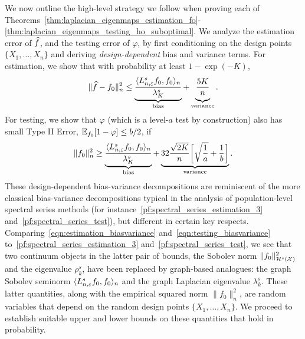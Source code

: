 We now outline the high-level strategy we follow when proving each of Theorems~\ref{thm:laplacian_eigenmaps_estimation_fo}-\ref{thm:laplacian_eigenmaps_testing_ho_suboptimal}. We analyze the estimation error of $\widehat{f}$, and the testing error of $\varphi$, by first conditioning on the design points $\{X_1,\ldots,X_n\}$ and deriving \emph{design-dependent} bias and variance terms. For estimation, we show that with probability at least $1 - \exp(-K)$,
\begin{equation}
\label{eqn:estimation_biasvariance}
\|\wh{f} - f_0\|_n^2 \leq \underbrace{\frac{\dotp{L_{n,\varepsilon}^s f_0}{f_0}_n}{\lambda_{K}^s}}_{\textrm{bias}} + \underbrace{\frac{5K}{n} \vphantom{\frac{\dotp{L^s f_0}{f_0}_n}{\lambda_{K}^s}}}_{\textrm{variance}}.
\end{equation}
For testing, we show that $\varphi$ (which is a level-$a$ test by construction) also has small Type II Error, $\mathbb{E}_{f_0}[1 - \varphi] \leq b/2$, if 
\begin{equation}
\label{eqn:testing_biasvariance}
\|f_0\|_n^2 \geq  \underbrace{\frac{\langle L_{n,\varepsilon}^s f_0, f_0 \rangle_n}{\lambda_{K}^s}}_{\textrm{bias}} + \underbrace{32\frac{\sqrt{2K}}{n}\biggl[\sqrt{\frac{1}{a}} + \frac{1}{b}\biggr]}_{\textrm{variance}}.
\end{equation}
These design-dependent bias-variance decompositions are reminiscent of the more classical bias-variance decompositions typical in the analysis of population-level spectral series methods (for instance~\eqref{pf:spectral_series_estimation_3} and~\eqref{pf:spectral_series_test}), but different in certain key respects. Comparing~\eqref{eqn:estimation_biasvariance} and~\eqref{eqn:testing_biasvariance} to~\eqref{pf:spectral_series_estimation_3} and~\eqref{pf:spectral_series_test}, we see that two continuum objects in the latter pair of bounds, the Sobolev norm $\|f_0\|_{\mathcal{H}^s(\mathcal{X})}^2$ and the eigenvalue $\rho_k^s$, have been replaced by graph-based analogues: the graph Sobolev seminorm $\langle L_{n,\varepsilon}^sf_0, f_0 \rangle_n$ and the graph Laplacian eigenvalue $\lambda_k^s$. These latter quantities, along with the empirical squared norm $\|f_0\|_n^2$, are random variables that depend on the random design points $\{X_1,\ldots,X_n\}$. We proceed to establish suitable upper and lower bounds on these quantities that hold in probability. 

